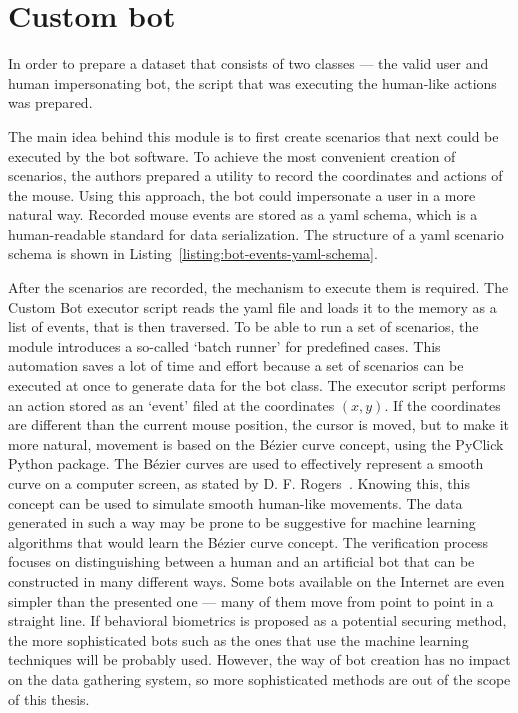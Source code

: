 \section{Custom bot}\label{sec:custom-bot}
In order to prepare a dataset that consists of two classes --- the valid user and human impersonating bot, the script that was executing the human-like actions was prepared.

The main idea behind this module is to first create scenarios that next could be executed by the bot software.
To achieve the most convenient creation of scenarios, the authors prepared a utility to record the coordinates and actions of the mouse.
Using this approach, the bot could impersonate a user in a more natural way.
Recorded mouse events are stored as a \gls{yaml} schema, which is a human-readable standard for data serialization.
The structure of a \gls{yaml} scenario schema is shown in Listing~\ref{listing:bot-events-yaml-schema}.


After the scenarios are recorded, the mechanism to execute them is required.
The Custom Bot executor script reads the \gls{yaml} file and loads it to the memory as a list of events, that is then traversed.
To be able to run a set of scenarios, the module introduces a so-called `batch runner' for predefined cases.
This automation saves a lot of time and effort because a set of scenarios can be executed at once to generate data for the bot class.
The executor script performs an action stored as an `event' filed at the coordinates $(x, y)$.
If the coordinates are different than the current mouse position, the cursor is moved, but to make it more natural, movement is based on the Bézier curve concept, using the PyClick Python package.
The Bézier curves are used to effectively represent a smooth curve on a computer screen, as stated by D. F. Rogers~\cite{bezier-curves}.
Knowing this, this concept can be used to simulate smooth human-like movements.
The data generated in such a way may be prone to be suggestive for machine learning algorithms that would learn the Bézier curve concept.
The verification process focuses on distinguishing between a human and an artificial bot that can be constructed in many different ways.
Some bots available on the Internet are even simpler than the presented one --- many of them move from point to point in a straight line.
If behavioral biometrics is proposed as a potential securing method, the more sophisticated bots such as the ones that use the machine learning techniques will be probably used.
However, the way of bot creation has no impact on the data gathering system, so more sophisticated methods are out of the scope of this thesis.
